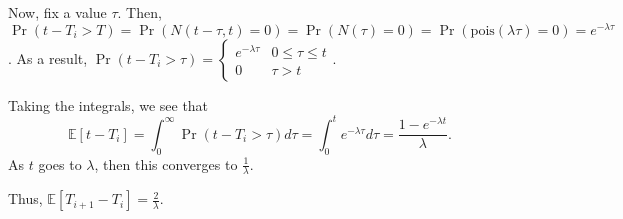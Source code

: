 \documentclass{article}
\newcommand{\EE}{\mathbb{E}}
\newcommand{\pois}{\mathrm{pois}}
\begin{document}
Now, fix a value $\tau$. Then, $\Pr(t - T_i > T) = \Pr(N(t-\tau, t) = 0) = \Pr(N(\tau) = 0) = \Pr(\pois(\lambda \tau) = 0) = e^{- \lambda \tau}$.
As a result, $\Pr(t - T_i > \tau) = \begin{cases} e^{-\lambda \tau} & 0 \leq \tau \leq t \\ 0 & \tau > t \end{cases}$.

Taking the integrals, we see that 
\[\EE[t - T_i] = \int_{0}^{\infty} \Pr(t - T_i > \tau) d \tau = \int_{0}^t e^{-\lambda \tau} d\tau = \frac{1 - e^{-\lambda t}}{\lambda}.\] 
As $t$ goes to $\lambda$, then this converges to $\frac{1}{\lambda}$. 

Thus, $\EE[T_{i+1} - T_i] = \boxed{\frac{2}{\lambda}}$.
\end{document}
